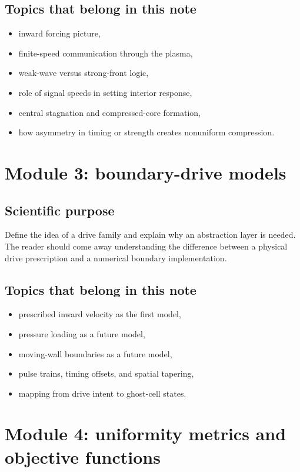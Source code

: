 \documentclass[11pt]{article}
\begin{document}
\subsection{Topics that belong in this note}
\begin{itemize}[leftmargin=1.8em]
    \item inward forcing picture,
    \item finite-speed communication through the plasma,
    \item weak-wave versus strong-front logic,
    \item role of signal speeds in setting interior response,
    \item central stagnation and compressed-core formation,
    \item how asymmetry in timing or strength creates nonuniform compression.
\end{itemize}

\section{Module 3: boundary-drive models}
\subsection{Scientific purpose}
Define the idea of a drive family and explain why an abstraction layer is needed. The reader should come away understanding the difference between a physical drive prescription and a numerical boundary implementation.

\subsection{Topics that belong in this note}
\begin{itemize}[leftmargin=1.8em]
    \item prescribed inward velocity as the first model,
    \item pressure loading as a future model,
    \item moving-wall boundaries as a future model,
    \item pulse trains, timing offsets, and spatial tapering,
    \item mapping from drive intent to ghost-cell states.
\end{itemize}

\section{Module 4: uniformity metrics and objective functions}
\end{document}
